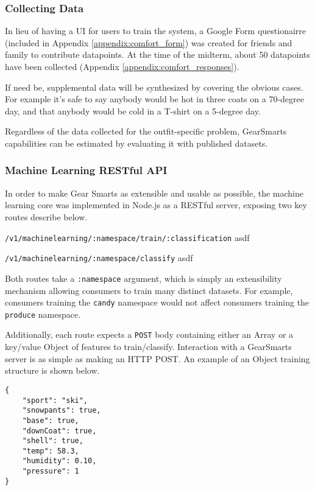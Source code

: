 \subsubsection{Collecting Data}
In lieu of having a UI for users to train the system, a Google Form questionairre (included in Appendix
\ref{appendix:comfort_form}) was created for
friends and family to contribute datapoints. At the time of the midterm, about 50 datapoints have been collected
(Appendix \ref{appendix:comfort_responses}).

If need be, supplemental data will be synthesized by covering the obvious cases. For example it's safe to say anybody
would be hot in three coats on a 70-degree day, and that anybody would be cold in a T-shirt on a 5-degree day.

Regardless of the data collected for the outfit-specific problem, GearSmarts capabilities can be estimated by evaluating
it with published datasets.

\subsubsection{Machine Learning RESTful API}
\label{section:mlapi}
In order to make Gear Smarts as extensible and usable as possible, the machine learning core was implemented in Node.js
as a RESTful server, exposing two key routes describe below.

\begin{description}
    \item{\texttt{/v1/machinelearning/:namespace/train/:classification}} asdf
    \item{\texttt{/v1/machinelearning/:namespace/classify}} asdf
\end{description}

Both routes take a \texttt{:namespace} argument, which is simply an extensibility mechanism allowing consumers to train
many distinct datasets. For example, consumers training the \texttt{candy} namespace would not affect consumers training
the \texttt{produce} namespace.

Additionally, each route expects a \texttt{POST} body containing either an Array or a key/value Object of features to
train/classify. Interaction with a GearSmarts server is as simple as making an HTTP POST. An example of an Object
training structure is shown below.

\begin{lstlisting}
{
    "sport": "ski",
    "snowpants": true,
    "base": true,
    "downCoat": true,
    "shell": true,
    "temp": 58.3,
    "humidity": 0.10,
    "pressure": 1
}
\end{lstlisting}

